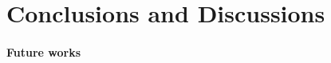 \documentclass[sigconf]{acmart}
\begin{document}
\section{Conclusions and Discussions}




\paragraph{Future works}










\appendix
\end{document}
